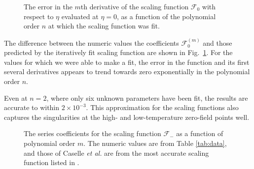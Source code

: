 \documentclass[
aps,
pre,
preprint,
longbibliography,
floatfix
]{revtex4-2}
\begin{document}
\begin{figure}
  \caption{
    The error in the $m$th derivative of the scaling function $\mathcal F_0$
    with respect to $\eta$ evaluated at $\eta=0$, as a function of the
    polynomial order $n$ at which the scaling function was fit.
  } \label{fig:error}
\end{figure}

The difference between the numeric values the coefficients $\mathcal F_0^{(m)}$
and those predicted by the iteratively fit scaling function are shown in
Fig.~\ref{fig:error}. For the values for which we were able to make a fit, the
error in the function and its first several derivatives appears to trend
towards zero exponentially in the polynomial order $n$.

Even at $n=2$, where only six unknown parameters have been fit, the results are
accurate to within $2\times10^{-3}$. This approximation for the scaling functions also captures the singularities at the high- and low-temperature zero-field points well. 

\begin{figure}
  \caption{
    The series coefficients for the scaling function $\mathcal F_-$ as a
    function of polynomial order $m$. The numeric values are from Table
    \ref{tab:data}, and those of Caselle \textit{et al.} are from the most
    accurate scaling function listed in \cite{Caselle_2001_The}.
  } \label{fig:glow.series}
\end{figure}
\end{document}
